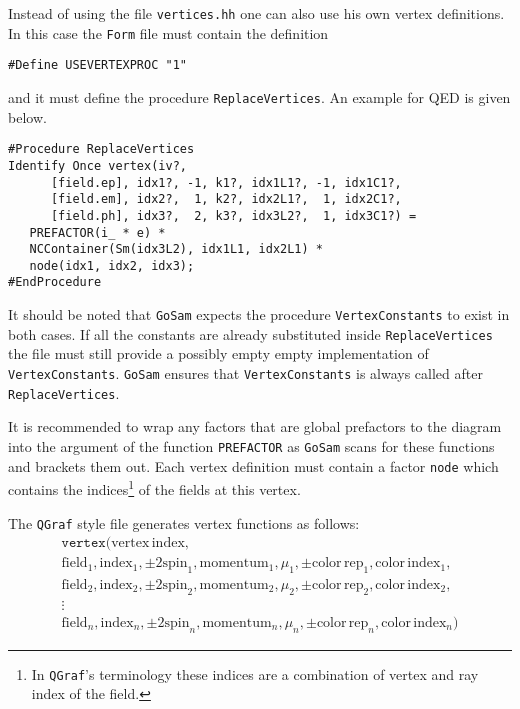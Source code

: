 \documentclass[11pt,a4paper]{refrep}
\newcommand{\golemversion}{{1{.}0}}
\newcommand{\golemv}[1][\golemversion]{{\tt GoSam}\xspace}
\newcommand{\qgraf}{{\tt QGraf}\xspace}
\newcommand{\form}{{\tt Form}\xspace}
\begin{document}
Instead of using the file \texttt{vertices.hh} one can also use
his own vertex definitions. In this case the \form{} file must contain
the definition
\begin{lstlisting}[language=form]
#Define USEVERTEXPROC "1"
\end{lstlisting}
and it must define the procedure \texttt{ReplaceVertices}. An example
for QED is given below.
\begin{maxipage}
\begin{lstlisting}[language=form]
#Procedure ReplaceVertices
Identify Once vertex(iv?,
      [field.ep], idx1?, -1, k1?, idx1L1?, -1, idx1C1?,
      [field.em], idx2?,  1, k2?, idx2L1?,  1, idx2C1?,
      [field.ph], idx3?,  2, k3?, idx3L2?,  1, idx3C1?) =
   PREFACTOR(i_ * e) *
   NCContainer(Sm(idx3L2), idx1L1, idx2L1) *
   node(idx1, idx2, idx3);
#EndProcedure
\end{lstlisting}
\end{maxipage}
It should be noted that \golemv{} expects the procedure \texttt{VertexConstants}
to exist in both cases. If all the constants are already substituted inside
\texttt{ReplaceVertices} the file must still provide a possibly empty empty
implementation of \texttt{VertexConstants}. \golemv{} ensures that
\texttt{VertexConstants} is always called after \texttt{ReplaceVertices}.

It is recommended to wrap any factors that are global prefactors to the diagram
into the argument of the function \texttt{PREFACTOR} as \golemv{} scans for these
functions and brackets them out. Each vertex definition must contain a factor
\texttt{node} which contains the indices\footnote{In \qgraf's terminology
these indices are a combination of vertex and ray index of the field.}
of the fields at this vertex.

The \qgraf{} style file generates vertex functions as follows:
\begin{multline*}
\mathtt{vertex}(\mathrm{vertex\,index},\\
   \mathrm{field}_1, \mathrm{index}_1, \pm2\mathrm{spin}_1, \mathrm{momentum}_1, \mu_1, \pm\mathrm{color\,rep}_1, %
   \mathrm{color\,index}_1,\\
   \mathrm{field}_2, \mathrm{index}_2, \pm2\mathrm{spin}_2, \mathrm{momentum}_2, \mu_2, \pm\mathrm{color\,rep}_2, %
   \mathrm{color\,index}_2,\\
   \vdots\\
   \mathrm{field}_n, \mathrm{index}_n, \pm2\mathrm{spin}_n, \mathrm{momentum}_n, \mu_n, \pm\mathrm{color\,rep}_n, %
   \mathrm{color\,index}_n)
\end{multline*}
\end{document}
